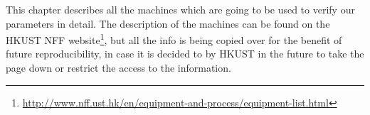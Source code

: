 This chapter describes all the machines which are going to be used to verify our parameters in detail.
The description of the machines can be found on the HKUST NFF website\footnote{\url{http://www.nff.ust.hk/en/equipment-and-process/equipment-list.html}}, but all the info is being copied over for the benefit of future reproducibility, in case it is decided to by HKUST in the future to take the page down or restrict the access to the information.
